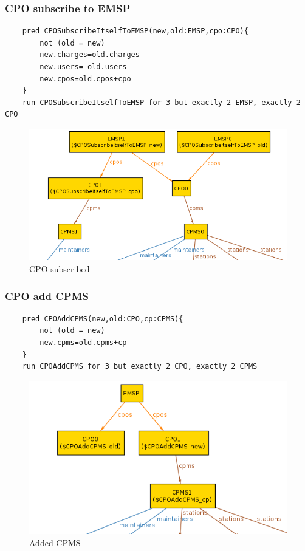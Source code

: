 \subsubsection{CPO subscribe to EMSP}
\begin{verbatim}
    pred CPOSubscribeItselfToEMSP(new,old:EMSP,cpo:CPO){
        not (old = new)
        new.charges=old.charges
        new.users= old.users
        new.cpos=old.cpos+cpo
    }
    run CPOSubscribeItselfToEMSP for 3 but exactly 2 EMSP, exactly 2 CPO             
\end{verbatim}
\begin{figure}[H]
    \includegraphics[keepaspectratio, width=16cm]{Alloy/CpoSubscribe.png}
    \caption{CPO subscribed}
\end{figure}

\subsubsection{CPO add CPMS}
\begin{verbatim}
    pred CPOAddCPMS(new,old:CPO,cp:CPMS){
        not (old = new)
        new.cpms=old.cpms+cp
    }
    run CPOAddCPMS for 3 but exactly 2 CPO, exactly 2 CPMS   
\end{verbatim}
\begin{figure}[H]
    \includegraphics[keepaspectratio, width=16cm]{Alloy/CpoAddCPMS.png}
    \caption{Added CPMS}
\end{figure}

